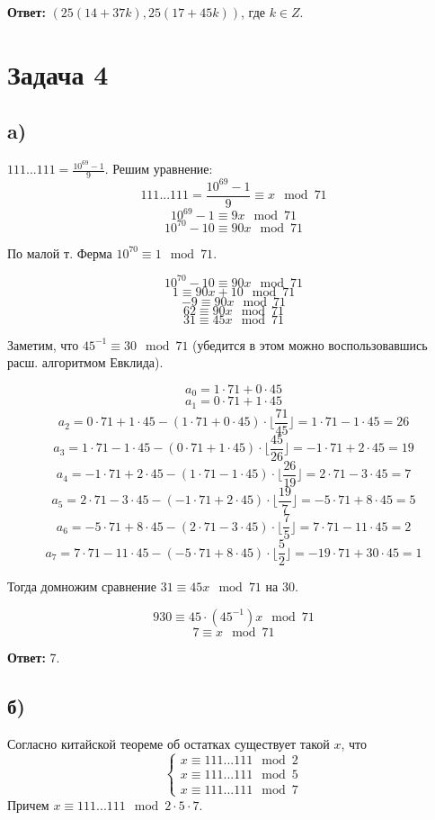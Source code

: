 \documentclass{article}
\begin{document}
		\textbf{Ответ:} $(25(14 + 37k), 25(17 + 45k))$, где $k \in Z$.	
		
		\section {Задача 4}
		
		\subsection {a)} $111...111 = \frac{10^{69} - 1}{9}$. Решим уравнение:
		$$111...111 = \frac{10^{69} - 1}{9} \equiv x \mod 71$$ 
				$$10^{69} - 1 \equiv 9x \mod 71$$
				$$10^{70} - 10 \equiv 90x \mod 71$$
		
		По малой т. Ферма $10^{70} \equiv 1 \mod 71$.
		
				$$10^{70} - 10 \equiv 90x \mod 71$$
				$$1 \equiv 90x + 10 \mod 71$$
				$$-9 \equiv 90x \mod 71$$
				$$62 \equiv 90x \mod 71$$
				$$31 \equiv 45x \mod 71$$
				
		Заметим, что $ 45^{-1} \equiv 30 \mod 71$ (убедится в этом можно воспользовавшись расш. алгоритмом Евклида).
		
		$$ a_0 = 1 \cdot 71 + 0 \cdot 45 $$ 
		$$ a_1 = 0 \cdot 71 + 1 \cdot 45 $$ 
		$$ a_2 = 0 \cdot 71 + 1 \cdot 45 - (1 \cdot 71 + 0 \cdot 45) \cdot \lfloor\frac{71} {45}\rfloor = 1 \cdot 71 - 1 \cdot 45 = 26 $$
		$$ a_3 = 1 \cdot 71 - 1 \cdot 45 - (0 \cdot 71 + 1 \cdot 45) \cdot \lfloor\frac{45} {26}\rfloor = -1 \cdot 71 + 2 \cdot 45 = 19 $$
		$$ a_4 = -1 \cdot 71 + 2 \cdot 45 - (1 \cdot 71 - 1 \cdot 45) \cdot \lfloor\frac{26} {19}\rfloor = 2 \cdot 71 - 3 \cdot 45 = 7 $$
		$$ a_5 = 2 \cdot 71 - 3 \cdot 45 - (-1 \cdot 71 + 2 \cdot 45) \cdot \lfloor\frac{19} {7}\rfloor = -5 \cdot 71 + 8 \cdot 45 = 5 $$
		$$ a_6 = -5 \cdot 71 + 8 \cdot 45 - (2 \cdot 71 - 3 \cdot 45) \cdot \lfloor\frac{7} {5}\rfloor = 7 \cdot 71 - 11 \cdot 45 = 2 $$
		$$ a_7 = 7 \cdot 71 - 11 \cdot 45 - (-5 \cdot 71 + 8 \cdot 45) \cdot \lfloor\frac{5} {2}\rfloor = -19 \cdot 71 + 30 \cdot 45 = 1 $$
		
		Тогда домножим сравнение $31 \equiv 45x \mod 71$ на $30$.
			
			$$930 \equiv 45 \cdot (45^{-1})x \mod 71$$
			$$7 \equiv x \mod 71$$
			
		\textbf{Ответ:} 7.
		
		\subsection {б)} Согласно китайской теореме об остатках существует такой $x$, что 
			\begin{equation*} 
				\begin{cases}
					x \equiv 111...111 \mod 2 \\
					x \equiv 111...111 \mod 5 \\
					x \equiv 111...111 \mod 7
				\end{cases}
			\end{equation*}
		Причем  $x \equiv 111...111 \mod 2 \cdot 5 \cdot 7 $.
		
\end{document}
